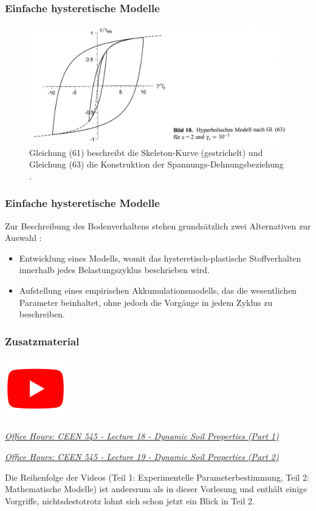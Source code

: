 \begin{frame}
\frametitle{Einfache hysteretische Modelle}
\begin{figure}
\centering
\includegraphics[width=0.95\linewidth]{fig_img/bild18.jpg}
\caption*{Gleichung (61) beschreibt die Skeleton-Kurve (gestrichelt)
und Gleichung (63) die Konstruktion der Spannungs-Dehnungsbeziehung
\cite{Vrettos2017}.} 
\end{figure}
\end{frame}

\begin{frame}
\frametitle{Einfache hysteretische Modelle}
Zur Beschreibung des Bodenverhaltens stehen grundsätzlich zwei Alternativen zur Auswahl \cite{Vrettos2017}:
\begin{itemize}
 \item Entwicklung eines Modells, womit das hysteretisch-plastische Stoffverhalten innerhalb jedes Belastungszyklus beschrieben wird. 
 \item Aufstellung eines empirischen Akkumulationsmodells, das die wesentlichen Parameter beinhaltet, ohne jedoch die Vorgänge in jedem Zyklus zu beschreiben.
\end{itemize}
\end{frame}

\begin{frame}
\frametitle{Zusatzmaterial} %
\vfill
\begin{center}
\includegraphics[width=0.2\textwidth]{fig_img/youtube.png}  

\href{https://www.youtube.com/watch?v=01_KWg3QriE}{\textsl{Office Hours: CEEN 545 - Lecture 18 - Dynamic Soil Properties (Part 1)}}

\href{https://www.youtube.com/watch?v=Mngr3tujIjM}{\textsl{Office Hours: CEEN 545 - Lecture 19 - Dynamic Soil Properties (Part 2)}}
\end{center}  
\vfill
Die Reihenfolge der Videos (Teil 1: Experimentelle Parameterbestimmung, Teil 2: Mathematische Modelle) ist andersrum als in dieser Vorlesung und enthält einige Vorgriffe, nichtsdestotrotz lohnt sich schon jetzt ein Blick in Teil 2.

\end{frame}

